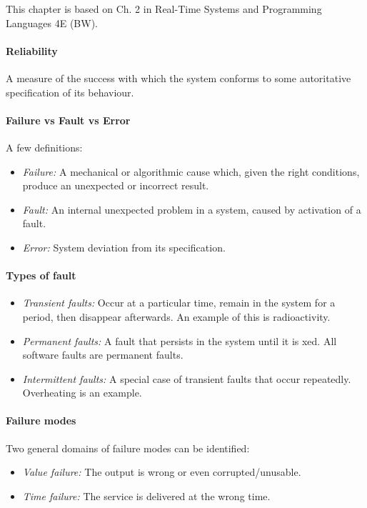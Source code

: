 
This chapter is based on Ch. 2 in Real-Time Systems and Programming Languages 4E (BW).

\sepline

\paragraph{Reliability} A measure of the success with which the system conforms to some autoritative specification of its behaviour.

\paragraph{Failure vs Fault vs Error} A few definitions:
\begin{itemize}
  \item \textit{Failure:} A mechanical or algorithmic cause which, given the right conditions, produce an unexpected or incorrect result.
  \item \textit{Fault:} An internal unexpected problem in a system, caused by activation of a fault.
  \item \textit{Error:} System deviation from its specification.
\end{itemize}



\paragraph{Types of fault}
\begin{itemize}[nolistsep,noitemsep]
  \item \textit{Transient faults:} Occur at a particular time, remain in the system for a period, then disappear afterwards. An example of this is radioactivity.
  \item \textit{Permanent faults:} A fault that persists in the system until it is  xed. All software faults are permanent faults.
  \item \textit{Intermittent faults:} A special case of transient faults that occur repeatedly. Overheating is an example.
\end{itemize}

\paragraph{Failure modes} Two general domains of failure modes can be identified:
\begin{itemize}[nolistsep,noitemsep]
  \item \textit{Value failure:} The output is wrong or even corrupted/unusable.
  \item \textit{Time failure:} The service is delivered at the wrong time.
\end{itemize}

